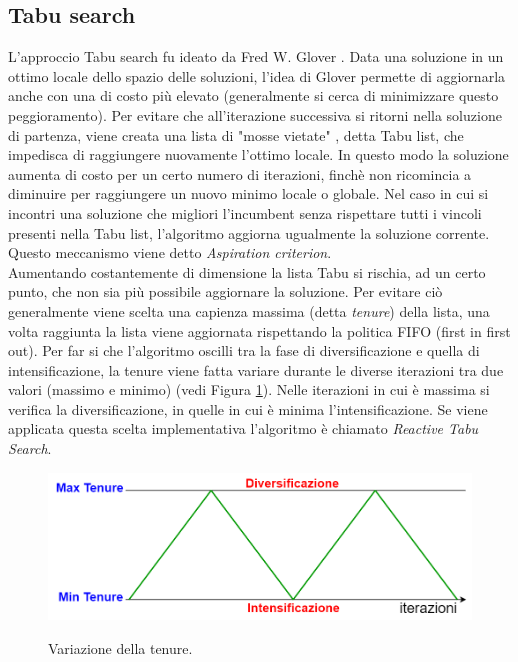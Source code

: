 \subsection{Tabu search}%
L'approccio Tabu search fu ideato da Fred W. Glover \cite{Tabu}. Data una soluzione in un ottimo locale dello spazio delle soluzioni, l'idea di Glover permette di aggiornarla anche con una di costo più elevato (generalmente si cerca di minimizzare questo peggioramento). Per evitare che all'iterazione successiva si ritorni nella soluzione di partenza, viene creata una lista di "mosse vietate" , detta Tabu list, che impedisca di raggiungere nuovamente l'ottimo locale. In questo modo la soluzione aumenta di costo per un certo numero di iterazioni, finchè non ricomincia a diminuire per raggiungere un nuovo minimo locale o globale. Nel caso in cui si incontri una soluzione che migliori l'incumbent senza rispettare tutti i vincoli presenti nella Tabu list, l'algoritmo aggiorna ugualmente la soluzione corrente. Questo meccanismo viene detto \textit{Aspiration criterion}.\\ 
Aumentando costantemente di dimensione la lista Tabu si rischia, ad un certo punto, che non sia più possibile aggiornare la soluzione. Per evitare ciò generalmente viene scelta una capienza massima (detta \textit{tenure}) della lista, una volta raggiunta la lista viene aggiornata rispettando la politica FIFO (first in first out). Per far si che l'algoritmo oscilli tra la fase di diversificazione e quella di intensificazione, la tenure viene fatta variare durante le diverse iterazioni tra due valori (massimo e minimo) (vedi Figura \ref{tenure}). Nelle iterazioni in cui è massima si verifica la diversificazione, in quelle in cui è minima l'intensificazione. Se viene applicata questa scelta implementativa l'algoritmo è chiamato \textit{Reactive Tabu Search}.
 \begin{figure}[H] 
\begin{center} 
  \includegraphics[scale=0.35]{Images/tenure}\\ 
  \caption{\footnotesize{Variazione della tenure.}}
  \label{tenure}
\end{center}
\end{figure}
